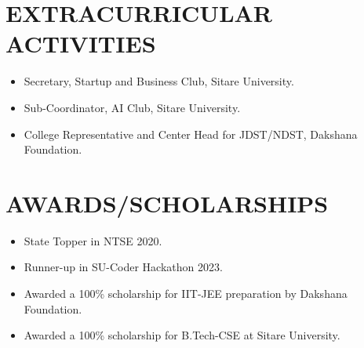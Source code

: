 \documentclass[a4paper,10pt]{article}
\begin{document}
\section*{EXTRACURRICULAR ACTIVITIES}
\begin{itemize}[leftmargin=4em]
\item Secretary, Startup and Business Club, Sitare University.
\item Sub-Coordinator, AI Club, Sitare University.
\item College Representative and Center Head for JDST/NDST, Dakshana Foundation.
\end{itemize}


\section*{AWARDS/SCHOLARSHIPS}
\begin{itemize}[leftmargin=4em]
\item State Topper in NTSE 2020.
\item Runner-up in SU-Coder Hackathon 2023.
\item Awarded a 100\% scholarship for IIT-JEE preparation by Dakshana Foundation.
\item Awarded a 100\% scholarship for B.Tech-CSE at Sitare University.


\end{itemize}
\end{document}

